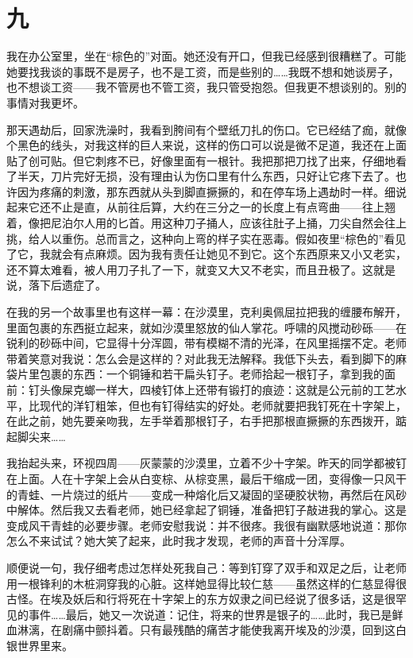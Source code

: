 \section*{九} 

我在办公室里，坐在“棕色的”对面。她还没有开口，但我已经感到很糟糕了。可能她要找我谈的事既不是房子，也不是工资，而是些别的……我既不想和她谈房子，也不想谈工资——我不管房也不管工资，我只管受抱怨。但我更不想谈别的。别的事情对我更坏。 

那天遇劫后，回家洗澡时，我看到胯间有个壁纸刀扎的伤口。它已经结了痂，就像个黑色的线头，对我这样的巨人来说，这样的伤口可以说是微不足道，我还在上面贴了创可贴。但它刺疼不已，好像里面有一根针。我把那把刀找了出来，仔细地看了半天，刀片完好无损，没有理由认为伤口里有什么东西，只好让它疼下去了。也许因为疼痛的刺激，那东西就从头到脚直撅撅的，和在停车场上遇劫时一样。细说起来它还不止是直，从前往后算，大约在三分之一的长度上有点弯曲——往上翘着，像把尼泊尔人用的匕首。用这种刀子捅人，应该往肚子上捅，刀尖自然会往上挑，给人以重伤。总而言之，这种向上弯的样子实在恶毒。假如夜里“棕色的”看见了它，我就会有点麻烦。因为我有责任让她见不到它。这个东西原来又小又老实，还不算太难看，被人用刀子扎了一下，就变又大又不老实，而且丑极了。这就是说，落下后遗症了。 

在我的另一个故事里也有这样一幕：在沙漠里，克利奥佩屈拉把我的缠腰布解开，里面包裹的东西挺立起来，就如沙漠里怒放的仙人掌花。呼啸的风搅动砂砾——在锐利的砂砾中间，它显得十分浑圆，带有模糊不清的光泽，在风里摇摆不定。老师带着笑意对我说：怎么会是这样的？对此我无法解释。我低下头去，看到脚下的麻袋片里包裹的东西：一个铜锤和若干扁头钉子。老师拾起一根钉子，拿到我的面前：钉头像屎克螂一样大，四棱钉体上还带有锻打的痕迹：这就是公元前的工艺水平，比现代的洋钉粗笨，但也有钉得结实的好处。老师就要把我钉死在十字架上，在此之前，她先要亲吻我，左手举着那根钉子，右手把那根直撅撅的东西拨开，踮起脚尖来…… 

我抬起头来，环视四周——灰蒙蒙的沙漠里，立着不少十字架。昨天的同学都被钉在上面。人在十字架上会从白变棕、从棕变黑，最后干缩成一团，变得像一只风干的青蛙、一片烧过的纸片——变成一种熔化后又凝固的坚硬胶状物，再然后在风砂中解体。然后我又去看老师，她已经拿起了铜锤，准备把钉子敲进我的掌心。这是变成风干青蛙的必要步骤。老师安慰我说：并不很疼。我很有幽默感地说道：那你怎么不来试试？她大笑了起来，此时我才发现，老师的声音十分浑厚。 

顺便说一句，我仔细考虑过怎样处死我自己：等到钉穿了双手和双足之后，让老师用一根锋利的木桩洞穿我的心脏。这样她显得比较仁慈——虽然这样的仁慈显得很古怪。在埃及妖后和行将死在十字架上的东方奴隶之间已经说了很多话，这是很罕见的事件……最后，她又一次说道：记住，将来的世界是银子的……此时，我已是鲜血淋漓，在剧痛中颤抖着。只有最残酷的痛苦才能使我离开埃及的沙漠，回到这白银世界里来。 

